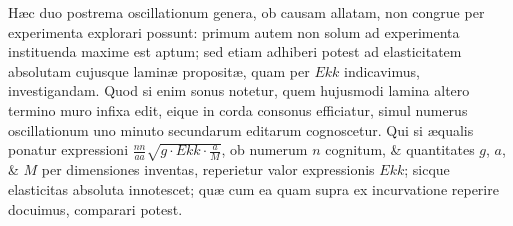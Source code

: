 Hæc duo postrema oscillationum genera, ob causam allatam, non congrue per experimenta explorari possunt: primum autem non solum ad experimenta instituenda maxime est aptum; sed etiam adhiberi potest ad elasticitatem absolutam cujusque laminæ propositæ, quam per $Ekk$ indicavimus, investigandam. Quod si enim sonus notetur, quem hujusmodi lamina altero termino muro infixa edit, eique in corda consonus efficiatur, simul numerus oscillationum uno minuto secundarum editarum cognoscetur. Qui si æqualis ponatur expressioni $\frac{nn}{aa}\sqrt{g\cdot Ekk\cdot\frac aM}$, ob numerum $n$ cognitum, \& quantitates $g$, $a$, \& $M$ per dimensiones inventas, reperietur valor expressionis $Ekk$; sicque elasticitas absoluta innotescet; quæ cum ea quam supra ex incurvatione reperire docuimus, comparari potest.
